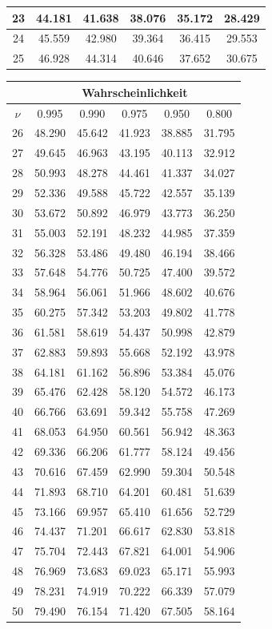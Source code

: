 \begin{small}
\begin{tabular}{c||c|c|c|c|c|}
\hline
23 & 44.181 & 41.638 & 38.076 & 35.172 & 28.429 \\ 
\hline
24 & 45.559 & 42.980 & 39.364 & 36.415 & 29.553 \\ 
\hline
25 & 46.928 & 44.314 & 40.646 & 37.652 & 30.675 \\ 
\hline
\end{tabular}
\hspace{2mm}
\begin{tabular}{c||c|c|c|c|c|}
 & \multicolumn{5}{c|}{Wahrscheinlichkeit}\\
\hline
$\nu$ & 0.995 & 0.990 & 0.975 & 0.950 & 0.800 \\ 
\hline\hline
26 & 48.290 & 45.642 & 41.923 & 38.885 & 31.795 \\ 
\hline
27 & 49.645 & 46.963 & 43.195 & 40.113 & 32.912 \\ 
\hline
28 & 50.993 & 48.278 & 44.461 & 41.337 & 34.027 \\ 
\hline
29 & 52.336 & 49.588 & 45.722 & 42.557 & 35.139 \\ 
\hline
30 & 53.672 & 50.892 & 46.979 & 43.773 & 36.250 \\ 
\hline
31 & 55.003 & 52.191 & 48.232 & 44.985 & 37.359 \\ 
\hline
32 & 56.328 & 53.486 & 49.480 & 46.194 & 38.466 \\ 
\hline
33 & 57.648 & 54.776 & 50.725 & 47.400 & 39.572 \\ 
\hline
34 & 58.964 & 56.061 & 51.966 & 48.602 & 40.676 \\ 
\hline
35 & 60.275 & 57.342 & 53.203 & 49.802 & 41.778 \\ 
\hline
36 & 61.581 & 58.619 & 54.437 & 50.998 & 42.879 \\ 
\hline
37 & 62.883 & 59.893 & 55.668 & 52.192 & 43.978 \\ 
\hline
38 & 64.181 & 61.162 & 56.896 & 53.384 & 45.076 \\ 
\hline
39 & 65.476 & 62.428 & 58.120 & 54.572 & 46.173 \\ 
\hline
40 & 66.766 & 63.691 & 59.342 & 55.758 & 47.269 \\ 
\hline
41 & 68.053 & 64.950 & 60.561 & 56.942 & 48.363 \\ 
\hline
42 & 69.336 & 66.206 & 61.777 & 58.124 & 49.456 \\ 
\hline
43 & 70.616 & 67.459 & 62.990 & 59.304 & 50.548 \\ 
\hline
44 & 71.893 & 68.710 & 64.201 & 60.481 & 51.639 \\ 
\hline
45 & 73.166 & 69.957 & 65.410 & 61.656 & 52.729 \\ 
\hline
46 & 74.437 & 71.201 & 66.617 & 62.830 & 53.818 \\ 
\hline
47 & 75.704 & 72.443 & 67.821 & 64.001 & 54.906 \\ 
\hline
48 & 76.969 & 73.683 & 69.023 & 65.171 & 55.993 \\ 
\hline
49 & 78.231 & 74.919 & 70.222 & 66.339 & 57.079 \\ 
\hline
50 & 79.490 & 76.154 & 71.420 & 67.505 & 58.164 \\ 
\hline
\end{tabular}
\end{small}



